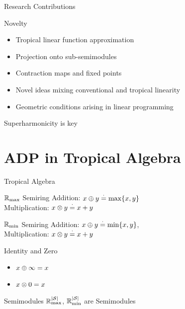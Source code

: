 \documentclass[10pt,handout]{beamer}
\begin{document}
\begin{frame}[fragile]{Research Contributions}
\begin{block}{Novelty}
\begin{itemize}
\item Tropical linear function approximation
\item Projection onto sub-semimodules
\item Contraction maps and fixed points
\item Novel ideas mixing conventional and tropical linearity
\item Geometric conditions arising in linear programming
\end{itemize}
\end{block}
\begin{block}{Superharmonicity is key}
\end{block}
\end{frame}

\section{ADP in Tropical Algebra}

\begin{frame}[fragile]{Tropical Algebra}

\begin{block}{$\mathbb{R}_{\max}$ Semiring}
Addition: $x\oplus y\stackrel{\cdot}{=}\max\{x,y\}$\\
Multiplication: $x\otimes y\stackrel{\cdot}{=} x+y$
\end{block}


\begin{block}{$\mathbb{R}_{\min}$ Semiring}
Addition: $x\oplus y\stackrel{\cdot}{=}\min\{x,y\}$,\\
Multiplication: $x\otimes y\stackrel{\cdot}{=} x+y$
\end{block}

\begin{block}{Identity and Zero}
\begin{itemize}
\item $x\oplus \infty=x$
\item $x\otimes 0 =x$
\end{itemize}
\end{block}

\begin{block}{Semimodules}
$\mathbb{R}_{\max}^{|\mathcal{S}|}$, $\mathbb{R}_{\min}^{|\mathcal{S}|}$ are Semimodules
\end{block}
\end{frame}
\end{document}
